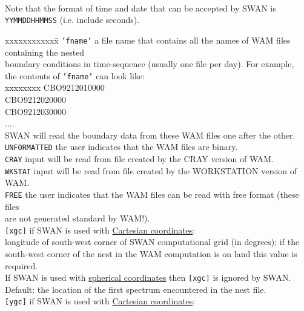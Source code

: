 \documentclass[12pt]{book}
\begin{document}
\\[2ex]
\noindent
Note that the format of time and date that can be accepted by SWAN is {\tt YYMMDDHHMMSS} (i.e. include seconds).
\begin{tabbing}
xxxxxxxxxxxx\= \kill
{\tt {'fname'}}   \> a file name that contains all the names of WAM files containing the nested\+\\
                     boundary conditions in time-sequence (usually one file per day). For example,\\
                     the contents of {\tt {'fname'}} can look like:\\
                     \pushtabs
                      xxxxxxxx \kill
                       CBO9212010000\\
                       CBO9212020000\\
                       CBO9212030000\\
                       ....\\
                     \poptabs
                     SWAN will read the boundary data from these WAM files one after the other.\-\\
{\tt UNFORMATTED} \> the user indicates that the WAM files are binary.\\
{\tt CRAY}        \> input will be read from file created by the CRAY version of WAM.\\
{\tt WKSTAT}      \> input will be read from file created by the WORKSTATION version of WAM.\\
{\tt FREE}        \> the user indicates that the WAM files can be read with free format (these files\+\\
                     are not generated standard by WAM!).\-\\
{\tt [xgc]}       \> if SWAN is used with \underline{Cartesian coordinates}:\+\\
                     longitude of south-west corner of SWAN computational grid (in degrees); if the\\
                     south-west corner of the nest in the WAM computation is on land this value is\\
                     required.\\
                     If SWAN is used with \underline{spherical coordinates} then {\tt [xgc]} is ignored by SWAN.\\
                     Default: the location of the first spectrum encountered in the nest file.\-\\
{\tt [ygc]}       \> if SWAN is used with \underline{Cartesian coordinates}:\+\\

\end{tabbing}
\end{document}
